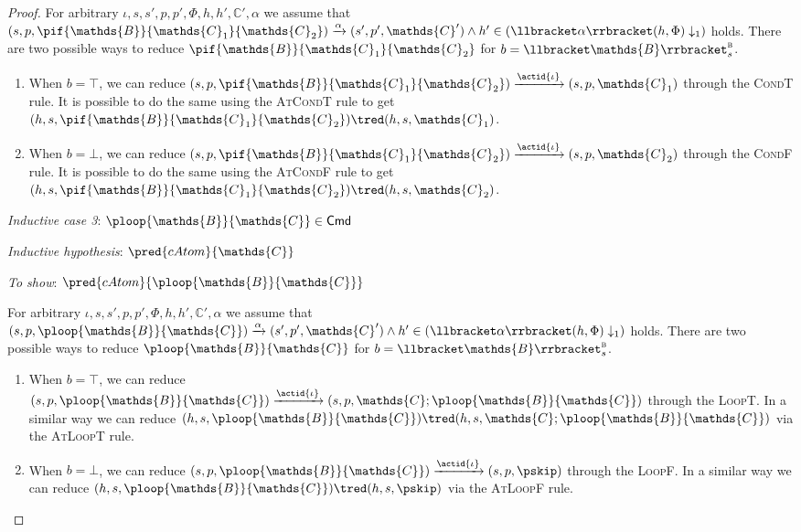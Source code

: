 \begin{lem}
{\begin{proof}
	For arbitrary $\iota, s, s', p, p', \Phi, h, h', \mathds{C}', \alpha$ we assume that $(s, p, \pif{\mathds{B}}{\mathds{C}_1}{\mathds{C}_2}) \xrightarrow{\alpha} (s', p', \mathds{C}') \land h' \in \left( \llbracket \alpha \rrbracket(h, \Phi) \downarrow_1 \right)$ holds. There are two possible ways to reduce $\pif{\mathds{B}}{\mathds{C}_1}{\mathds{C}_2}$ for $b = \llbracket \mathds{B} \rrbracket_{s}^{\textsc{b}}$.
	\begin{enumerate}
	\item When $b = \top$, we can reduce $(s, p, \pif{\mathds{B}}{\mathds{C}_1}{\mathds{C}_2}) \xrightarrow{\actid{\iota}} (s, p, \mathds{C}_1)$ through the \textsc{CondT} rule. It is possible to do the same using the \textsc{AtCondT} rule to get $(h, s, \pif{\mathds{B}}{\mathds{C}_1}{\mathds{C}_2}) \tred (h, s, \mathds{C}_1)$.
	\item When $b = \bot$, we can reduce $(s, p, \pif{\mathds{B}}{\mathds{C}_1}{\mathds{C}_2}) \xrightarrow{\actid{\iota}} (s, p, \mathds{C}_2)$ through the \textsc{CondF} rule. It is possible to do the same using the \textsc{AtCondF} rule to get $(h, s, \pif{\mathds{B}}{\mathds{C}_1}{\mathds{C}_2}) \tred (h, s, \mathds{C}_2)$.
	\end{enumerate}
	
	\textit{Inductive case 3}: $\ploop{\mathds{B}}{\mathds{C}} \in \mathsf{Cmd}$
	
	\textit{Inductive hypothesis}: $\pred{cAtom}{\mathds{C}}$
	
	\textit{To show}: $\pred{cAtom}{\ploop{\mathds{B}}{\mathds{C}}}$
	
	For arbitrary $\iota, s, s', p, p', \Phi, h, h', \mathds{C}', \alpha$ we assume that $(s, p, \ploop{\mathds{B}}{\mathds{C}}) \xrightarrow{\alpha} (s', p', \mathds{C}') \land h' \in \left( \llbracket \alpha \rrbracket(h, \Phi) \downarrow_1 \right)$ holds. There are two possible ways to reduce $\ploop{\mathds{B}}{\mathds{C}}$ for $b = \llbracket \mathds{B} \rrbracket_{s}^{\textsc{b}}$.
	\begin{enumerate}
	\item When $b = \top$, we can reduce $(s, p, \ploop{\mathds{B}}{\mathds{C}}) \xrightarrow{\actid{\iota}} (s, p, \mathds{C} ; \ploop{\mathds{B}}{\mathds{C}})$ through the \textsc{LoopT}. In a similar way we can reduce $(h, s, \ploop{\mathds{B}}{\mathds{C}}) \tred (h, s, \mathds{C} ; \ploop{\mathds{B}}{\mathds{C}})$ via the \textsc{AtLoopT} rule.
	\item When $b = \bot$, we can reduce $(s, p, \ploop{\mathds{B}}{\mathds{C}}) \xrightarrow{\actid{\iota}} (s, p, \pskip)$ through the \textsc{LoopF}. In a similar way we can reduce $(h, s, \ploop{\mathds{B}}{\mathds{C}}) \tred (h, s, \pskip)$ via the \textsc{AtLoopF} rule.
	\end{enumerate}
	\end{proof}
	}
\end{lem}

